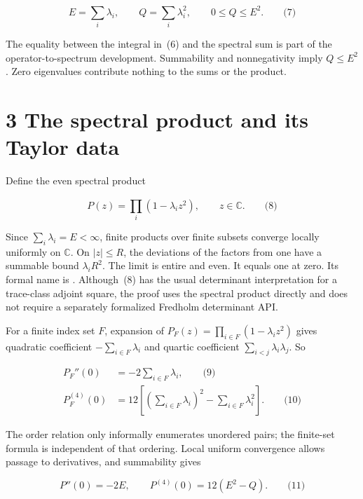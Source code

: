 \documentclass[
  11pt,
]{article}
\begin{document}
\[E = \sum_{i}^{}\lambda_{i},\quad\quad Q = \sum_{i}^{}\lambda_{i}^{2},\quad\quad 0 \leq Q \leq E^{2}.\quad\quad\text{(7)}\]

The equality between the integral in~(6) and the spectral sum is part of the operator-to-spectrum development. Summability and nonnegativity imply \(Q \leq E^{2}\). Zero eigenvalues contribute nothing to the sums or the product.

\hypertarget{the-spectral-product-and-its-taylor-data}{%
\section{3 The spectral product and its Taylor data}\label{the-spectral-product-and-its-taylor-data}}

Define the even spectral product

\[P(z) = \prod_{i}^{}\left( 1 - \lambda_{i}z^{2} \right),\quad\quad z \in \mathbb{C}.\quad\quad\text{(8)}\]

Since \(\sum_{i}^{}\lambda_{i} = E < \infty\), finite products over finite subsets converge locally uniformly on \(\mathbb{C}\). On \(|z| \leq R\), the deviations of the factors from one have a summable bound \(\lambda_{i}R^{2}\). The limit is entire and even. It equals one at zero. Its formal name is \texttt{}. Although~(8) has the usual determinant interpretation for a trace-class adjoint square, the proof uses the spectral product directly and does not require a separately formalized Fredholm determinant API.

For a finite index set \(F\), expansion of \(P_{F}(z) = \prod_{i \in F}^{}\left( 1 - \lambda_{i}z^{2} \right)\) gives quadratic coefficient \(- \sum_{i \in F}^{}\lambda_{i}\) and quartic coefficient \(\sum_{i < j}^{}\lambda_{i}\lambda_{j}\). So

\[\begin{matrix}
P_{F}''(0) & = - 2\sum_{i \in F}^{}\lambda_{i},\quad\quad\text{(9)} \\
P_{F}^{(4)}(0) & = 12\left\lbrack \left( \sum_{i \in F}^{}\lambda_{i} \right)^{2} - \sum_{i \in F}^{}\lambda_{i}^{2} \right\rbrack.\quad\quad\text{(10)}
\end{matrix}\]

The order relation only informally enumerates unordered pairs; the finite-set formula is independent of that ordering. Local uniform convergence allows passage to derivatives, and summability gives

\[P''(0) = - 2E,\quad\quad P^{(4)}(0) = 12\left( E^{2} - Q \right).\quad\quad\text{(11)}\]
\end{document}
